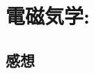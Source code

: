 \documentclass[../../sp_2018.tex]{subfiles}
\begin{document}
\setcounter{section}{2}
\section{電磁気学:}
\subsection{}


\subsection*{感想}
\end{document}

